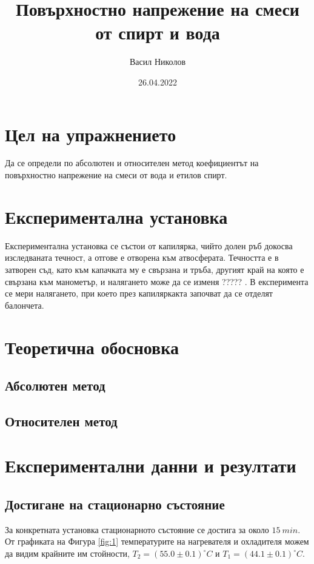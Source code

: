 \documentclass[reprint,amsmath,amssymb,aps,floatfix]{revtex4-2}
\newcommand{\degree}{^{\circ}}
\begin{document}
\title{Повърхностно напрежение на смеси от спирт и вода}

\author{Васил Николов}
\date{26.04.2022}
\maketitle


\section{Цел на упражнението}

Да се определи по абсолютен и относителен метод коефициентът на повърхностно напрежение на смеси от вода и етилов спирт. 

\section{Експериментална установка}

Експериментална установка се състои от капилярка, чийто долен ръб докосва изследваната течност, а отгове е отворена към атвосферата. Течността е в затворен съд, като към капачката му е свързана и тръба, другият край на която е свързана към манометър, и налягането може да се изменя ????? . В експеримента се мери налягането, при което през капиляркакта започват да се отделят балончета. 

\section{Теоретична обосновка}
\subsection{Абсолютен метод}


\subsection{Относителен метод}


\section{Експериментални данни и резултати}
\subsection{Достигане на стационарно състояние}

За конкретната установка стационарното състояние се достига за около $15 \ \si{min}$. От графиката на Фигура \ref{fig:1} температурите на нагревателя и охладителя можем да видим крайните им стойности, $T_2 = (55.0 \pm 0.1) \degree C$ и $T_1 = (44.1 \pm 0.1) \degree C$. 
\end{document}
